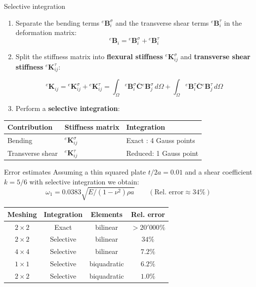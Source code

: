 \documentclass[aspectratio=169]{beamer}
\begin{document}
\begin{frame}{Selective integration}
  \begin{enumerate}
    \item Separate the bending terms ${}^e\mathbf B_i^\sigma$ and the transverse shear terms ${}^e\mathbf B_i^\tau$ in the deformation matrix:
          $${}^e\mathbf B_i={}^e\mathbf B_i^\sigma+{}^e\mathbf B_i^\tau$$
    \item Split the stiffness matrix into \textbf{flexural stiffness} ${}^e\mathbf K^\sigma_{ij}$ and \textbf{transverse shear stiffness} ${}^e\mathbf K^\tau_{ij}$:
          \begin{tcolorbox}[colback=darkred!10,colframe=darkred!40!black]
            $${}^e\mathbf K_{ij}={}^e\mathbf K^\sigma_{ij}+{}^e\mathbf K^\tau_{ij}=\int_\Omega{}^e\mathbf B_i^\sigma\overline{\mathbf C}{}^e\mathbf B_j^\sigma\, d\Omega +\int_\Omega{}^e\mathbf B_i^\tau\overline{\mathbf C}{}^e\mathbf B_j^\tau\, d\Omega$$
          \end{tcolorbox}
    \item Perform a \textbf{selective integration}:
  \end{enumerate}
  \begin{center}
    \begin{tabular}{lll}
      \hline
      {Contribution}   & {Stiffness matrix}          & {Integration}          \\
      \hline
      Bending          & ${}^e\mathbf K^\sigma_{ij}$ & Exact : 4 Gauss points \\
      Transverse shear & ${}^e\mathbf K^\tau_{ij}$
                       & Reduced: 1 Gauss point                               \\
      \hline
    \end{tabular}
  \end{center}
\end{frame}

\begin{frame}{Error estimates}
  Assuming a thin squared plate $t/2a=0.01$ and a shear coefficient $k=5/6$ with selective integration we obtain:
  $$\omega_1=0.0383\sqrt{E/(1-\nu^2)\rho a}\qquad (\text{Rel. error}\approx 34\%)$$
  \begin{center}
    \begin{tabular}{ccc|c}
      \hline
      Meshing     & Integration & Elements    & Rel. error                 \\
      \hline
      $2\times 2$ & Exact       & bilinear    & \color{darkred}$>20'000\%$ \\
      $2\times 2$ & Selective   & bilinear    & \color{darkred}$34\%$      \\
      $4\times 4$ & Selective   & bilinear    & $7.2\%$                    \\
      $1\times 1$ & Selective   & biquadratic & $6.2\%$                    \\
      $2\times 2$ & Selective   & biquadratic & $1.0\%$                    \\
      \hline
    \end{tabular}
  \end{center}
\end{frame}
\end{document}
